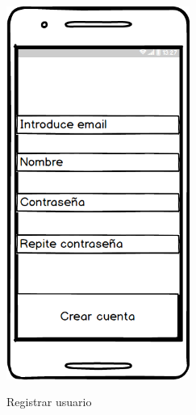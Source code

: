 \begin{figure}[htbp]
\begin{minipage}[b]{0.5\linewidth}
\end{minipage}
\hspace{0.5cm} %
\begin{minipage}[b]{0.5\linewidth}
\centering
\includegraphics[width=6cm]{maqueta/Registrarse.png}
 \label{figura2}
\caption{Registrar usuario}

\end{minipage}
\end{figure}










